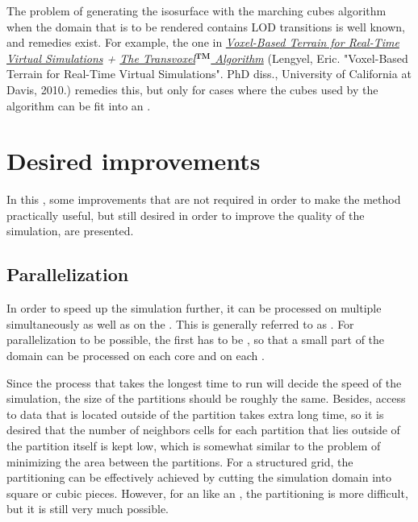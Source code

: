 The problem of generating the isosurface with the marching cubes algorithm when the domain that is to be rendered contains LOD transitions is well known, and remedies exist. For example, the one in \textit{\href{http://www.terathon.com/lengyel/Lengyel-VoxelTerrain.pdf}{Voxel-Based Terrain for Real-Time Virtual Simulations} + \href{http://www.terathon.com/voxels/}{The Transvoxel$^{\textbf{TM}}$ Algorithm}} (Lengyel, Eric. "Voxel-Based Terrain for Real-Time Virtual Simulations". PhD diss., University of California at Davis, 2010.) \citep{temp} remedies this, but only for cases where the cubes used by the algorithm can be fit into an \octree.

\section{Desired improvements}

In this \levelname, some improvements that are not required in order to make the method practically useful, but still desired in order to improve the quality of the simulation, are presented.

\subsection{Parallelization}

In order to speed up the simulation further, it can be processed on multiple \cores simultaneously as well as on the \GPU. This is generally referred to as \parallelization. For parallelization to be possible, the  first has to be \partitioned, so that a small part of the domain can be processed on each core and on each .

Since the process that takes the longest time to run will decide the speed of the simulation, the size of the partitions should be roughly the same. Besides, access to data that is located outside of the partition takes extra long time, so it is desired that the number of neighbors cells for each partition that lies outside of the partition itself is kept low, which is somewhat similar to the problem of minimizing the area between the partitions. For a structured grid, the partitioning can be effectively achieved by cutting the simulation domain into square or cubic pieces. However, for an  like an \octree, the partitioning is more difficult, but it is still very much possible.


